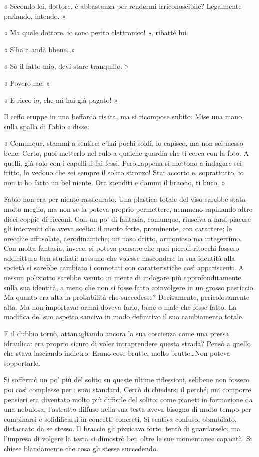 « Secondo lei, dottore, è abbastanza per rendermi irriconoscibile? Legalmente parlando, intendo. »

« Ma quale dottore, io sono perito elettronico! », ribatté lui.

« S'ha a andà bbene\ldots »

« So il fatto mio, devi stare tranquillo. »

« Povero me! »

« E ricco io, che mi hai già pagato! »

Il ceffo eruppe in una beffarda risata, ma si ricompose subito. Mise una mano sulla spalla di Fabio e disse:

« Comunque, stammi a sentire: c'hai pochi soldi, lo capisco, ma non sei messo bene. Certo, puoi metterlo nel culo a qualche guardia che ti cerca con la foto. A quelli, già solo con i capelli li fai fessi. Però\ldots appena si mettono a indagare sei fritto, lo vedono che sei sempre il solito stronzo! Stai accorto e, soprattutto, io non ti ho fatto un bel niente. Ora stenditi e dammi il braccio, ti buco. »

Fabio non era per niente rassicurato. Una plastica totale del viso sarebbe stata molto meglio, ma non se la poteva proprio permettere, nemmeno rapinando altre dieci coppie di ricconi. Con un po' di fantasia, comunque, riusciva a farsi piacere gli interventi che aveva scelto: il mento forte, prominente, con carattere; le orecchie affusolate, aerodinamiche; un naso dritto, armonioso ma integerrimo. Con molta fantasia, invece, si poteva pensare che quei piccoli ritocchi fossero addirittura ben studiati: nessuno che volesse nascondere la sua identità alla società si sarebbe cambiato i connotati con caratteristiche così appariscenti. A nessun poliziotto sarebbe venuto in mente di indagare più approfonditamente sulla sua identità, a meno che non si fosse fatto coinvolgere in un grosso pasticcio. Ma quanto era alta la probabilità che succedesse? Decisamente, pericolosamente alta. Ma non importava: ormai doveva farlo, bene o male che fosse fatto. La modifica del suo aspetto sanciva in modo definitivo il suo cambiamento totale.

E il dubbio tornò, attanagliando ancora la sua coscienza come una pressa idraulica: era proprio sicuro di voler intraprendere questa strada? Pensò a quello che stava lasciando indietro. Erano cose brutte, molto brutte\ldots Non poteva sopportarle.

Si soffermò un po' più del solito su queste ultime riflessioni, sebbene non fossero poi così complesse per i suoi standard. Cercò di chiedersi il perché, ma comporre pensieri era diventato molto più difficile del solito: come pianeti in formazione da una nebulosa, l'astratto diffuso nella sua testa aveva bisogno di molto tempo per combinarsi e solidificarsi in concetti concreti. Si sentiva confuso, obnubilato, distaccato da se stesso. Il braccio gli pizzicava forte: tentò di guardarselo, ma l'impresa di volgere la testa si dimostrò ben oltre le sue momentanee capacità. Si chiese blandamente che cosa gli stesse succedendo.

